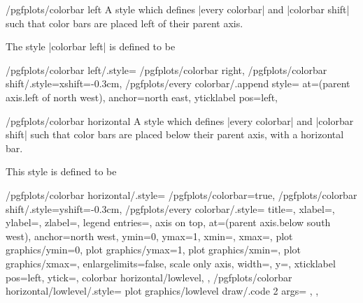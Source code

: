 \begin{stylekey}{/pgfplots/colorbar left}
	A style which defines |every colorbar| and |colorbar shift| such that color bars are placed left of their parent axis.
\begin{codeexample}[]
\end{codeexample}
	
	The style |colorbar left| is defined to be
\begin{codeexample}
/pgfplots/colorbar left/.style={%
	/pgfplots/colorbar right,
	/pgfplots/colorbar shift/.style={xshift=-0.3cm},
	/pgfplots/every colorbar/.append style={%
		at={(parent axis.left of north west)},
		anchor=north east,
		yticklabel pos=left,
	}%
}%
\end{codeexample}
\end{stylekey}

\begin{stylekey}{/pgfplots/colorbar horizontal}
	A style which defines |every colorbar| and |colorbar shift| such that color bars are placed below their parent axis, with a horizontal bar.
\begin{codeexample}[]
\end{codeexample}

	This style is defined to be
\begin{codeexample}
/pgfplots/colorbar horizontal/.style={%
	/pgfplots/colorbar=true,
	/pgfplots/colorbar shift/.style={yshift=-0.3cm},
	/pgfplots/every colorbar/.style={%
		title=,
		xlabel=,
		ylabel=,
		zlabel=,
		legend entries=,
		axis on top,
		at={(parent axis.below south west)},
		anchor=north west,
		ymin=0,
		ymax=1,
		xmin=,
		xmax=,
		plot graphics/ymin=0,%
		plot graphics/ymax=1,
		plot graphics/xmin=,
		plot graphics/xmax=,
		enlargelimits=false,
		scale only axis,
		width=,%
		y=,
		xticklabel pos=left,
		ytick=\empty,
		colorbar horizontal/lowlevel,
	}%
},%
/pgfplots/colorbar horizontal/lowlevel/.style={%
	plot graphics/lowlevel draw/.code 2 args={%
		\pgfplots@loc@TMPa
		\def\pgfplots@loc@TMPb{%
			\pgfdeclarehorizontalshading{tempshading}{\pgfkeysvalueof{/pgfplots/colorbar/width}}}%
		\expandafter\pgfplots@loc@TMPb\expandafter{\pgfplots@loc@TMPa}%
	},%
},%
\end{codeexample}
\end{stylekey}

